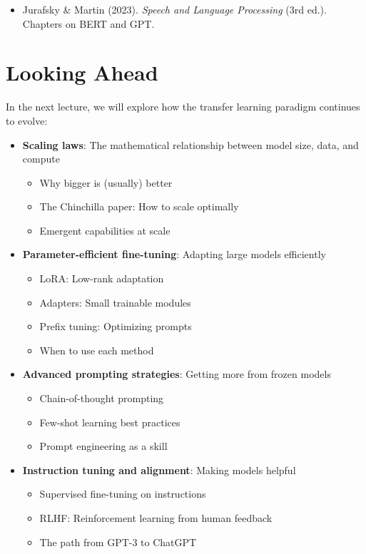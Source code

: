 \documentclass{article}
\begin{document}
\begin{itemize}

\item Jurafsky \& Martin (2023). \textit{Speech and Language Processing} (3rd ed.). Chapters on BERT and GPT.
\end{itemize}

\section{Looking Ahead}

In the next lecture, we will explore how the transfer learning paradigm continues to evolve:

\begin{itemize}
\item \textbf{Scaling laws}: The mathematical relationship between model size, data, and compute
\begin{itemize}
\item Why bigger is (usually) better
\item The Chinchilla paper: How to scale optimally
\item Emergent capabilities at scale
\end{itemize}

\item \textbf{Parameter-efficient fine-tuning}: Adapting large models efficiently
\begin{itemize}
\item LoRA: Low-rank adaptation
\item Adapters: Small trainable modules
\item Prefix tuning: Optimizing prompts
\item When to use each method
\end{itemize}

\item \textbf{Advanced prompting strategies}: Getting more from frozen models
\begin{itemize}
\item Chain-of-thought prompting
\item Few-shot learning best practices
\item Prompt engineering as a skill
\end{itemize}

\item \textbf{Instruction tuning and alignment}: Making models helpful
\begin{itemize}
\item Supervised fine-tuning on instructions
\item RLHF: Reinforcement learning from human feedback
\item The path from GPT-3 to ChatGPT
\end{itemize}


\end{itemize}
\end{document}
